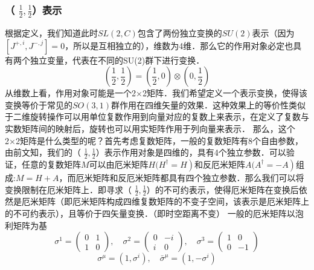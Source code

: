 \subsubsection{（ $\frac{1}{2},\frac{1}{2}$）表示}
根据定义，我们知道此时$SL(2,C)$包含了两份独立变换的$SU(2)$表示（因为$[J^{+, i}, J^{-, j}]=0$，所以是互相独立的），维数为4维．那么它的作用对象必定也具有两个独立变量，代表在不同的SU(2)群下进行变换．
\begin{equation}
\left(\frac{1}{2}, \frac{1}{2}\right)=\left(\frac{1}{2}, 0\right) \otimes\left(0, \frac{1}{2}\right)
\end{equation}
从维数上看，作用对象可能是一个2×2矩阵．我们希望定义一个表示变换，使得该变换等价于常见的$SO(3,1)$群作用在四维矢量的效果．这种效果上的等价性类似于二维旋转操作可以用单位复数作用到向量对应的复数上来表示，在定义了复数与实数矩阵间的映射后，旋转也可以用实矩阵作用于列向量来表示．
那么，这个2×2矩阵是什么类型的呢？首先考虑复数矩阵，一般的复数矩阵有8个自由参数，由前文知，我们的（ $\frac{1}{2},\frac{1}{2}$）表示作用对象是四维的，具有4个独立参数．可以验证，任意的复数矩阵$M$可以由厄米矩阵$H(\left.H^{\dagger}=H\right)$和反厄米矩阵$A(\left.A^{\dagger}=-A\right)$组成:$M=H+A$，而厄米矩阵和反厄米矩阵都具有四个独立参数．那么我们可以将变换限制在厄米矩阵上．即寻求（ $\frac{1}{2},\frac{1}{2}$）的不可约表示，使得厄米矩阵在变换后依然是厄米矩阵（即厄米矩阵构成四维复数矩阵的不变子空间，该表示是厄米矩阵上的不可约表示），且等价于四矢量变换．（即时空距离不变）
一般的厄米矩阵以泡利矩阵为基
\begin{equation}
\sigma^{1}=\left(\begin{array}{ll}
0 & 1 \\
1 & 0
\end{array}\right), \quad \sigma^{2}=\left(\begin{array}{cc}
0 & -i \\
i & 0
\end{array}\right), \quad \sigma^{3}=\left(\begin{array}{cc}
1 & 0 \\
0 & -1
\end{array}\right)
\end{equation}
\begin{equation}
\sigma^{\mu}=\left(1, \sigma^{i}\right), \quad \bar{\sigma}^{\mu}=\left(1,-\sigma^{i}\right)
\end{equation}
